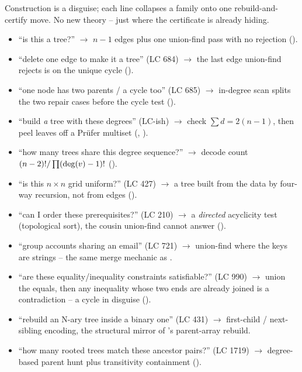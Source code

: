 
Construction is a disguise; each line collapses a family onto one rebuild-and-certify move. No new
theory -- just where the certificate is already hiding.

\begin{itemize}[nosep, leftmargin=1.4em]
  \item ``is this a tree?'' $\longrightarrow$ $n-1$ edges plus one union-find pass with no rejection
        ().
  \item ``delete one edge to make it a tree'' (LC 684) $\longrightarrow$ the last edge union-find
        rejects is on the unique cycle ().
  \item ``one node has two parents / a cycle too'' (LC 685) $\longrightarrow$ in-degree scan splits
        the two repair cases before the cycle test ().
  \item ``build \emph{a} tree with these degrees'' (LC-ish) $\longrightarrow$ check $\sum d=2(n-1)$,
        then peel leaves off a Pr\"ufer multiset (, ).
  \item ``how many trees share this degree sequence?'' $\longrightarrow$ decode count
        $(n-2)!/\prod(\operatorname{deg}(v)-1)!$ ().
  \item ``is this $n\times n$ grid uniform?'' (LC 427) $\longrightarrow$ a tree built from the
        data by four-way recursion, not from edges ().
  \item ``can I order these prerequisites?'' (LC 210) $\longrightarrow$ a \emph{directed} acyclicity
        test (topological sort), the cousin union-find cannot answer ().
  \item ``group accounts sharing an email'' (LC 721) $\longrightarrow$ union-find where the keys are
        strings -- the same merge mechanic as .
  \item ``are these equality/inequality constraints satisfiable?'' (LC 990) $\longrightarrow$ union
        the equals, then any inequality whose two ends are already joined is a contradiction -- a
        cycle in disguise ().
  \item ``rebuild an N-ary tree inside a binary one'' (LC 431) $\longrightarrow$ first-child /
        next-sibling encoding, the structural mirror of 's parent-array rebuild.
  \item ``how many rooted trees match these ancestor pairs?'' (LC 1719) $\longrightarrow$ degree-based
        parent hunt plus transitivity containment ().
\end{itemize}

